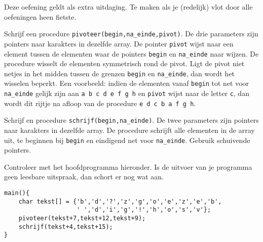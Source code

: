 \beginoef
Deze oefening geldt als extra uitdaging. Te maken als je (redelijk) vlot door alle oefeningen heen fietste.

Schrijf een procedure \verb}pivoteer(begin,na_einde,pivot)}. De drie parameters zijn pointers naar karakters in dezelfde array.
De pointer \verb}pivot} wijst naar een element tussen de elementen waar de pointers \verb}begin} en \verb}na_einde} naar wijzen.
De procedure wisselt de elementen symmetrisch rond de pivot. Ligt de pivot niet netjes in het midden tussen de grenzen \verb}begin} en \verb}na_einde}, 
dan wordt het wisselen beperkt. Een voorbeeld: indien de elementen vanaf \verb}begin} tot net voor \verb}na_einde} gelijk zijn aan
\verb}a b c d e f g h} en \verb}pivot} wijst naar de letter \verb}c}, dan wordt dit rijtje na afloop van de procedure \verb}e d c b a f g h}.

Schrijf en procedure \verb}schrijf(begin,na_einde)}. De twee parameters zijn pointers naar karakters in dezelfde array. 
De procedure schrijft alle elementen in de array uit, te beginnen bij \verb}begin} en eindigend net voor \verb}na_einde}.
Gebruik schuivende pointers.

Controleer met het hoofdprogramma hieronder. Is de uitvoer van je programma geen leesbare uitspraak, dan schort er nog wat aan.
\begin{verbatim}
main(){
    char tekst[] = {'b','d','?','z','g','o','e','z','e','b',
                    ' ','d','i','g','!','h','o','s','v'};
    pivoteer(tekst+7,tekst+12,tekst+9);
    schrijf(tekst+4,tekst+15);
}
\end{verbatim}
\endoef

